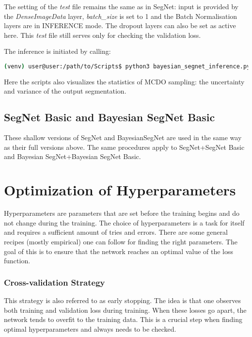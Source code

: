 \newpage
The setting of the \textit{test} file remains the same as in SegNet: input is provided by the \textit{DenseImageData} layer, \textit{batch\_size} is set to 1 and the Batch Normalisation layers are in INFERENCE mode. The dropout layers can also be set as active here. This \textit{test} file still serves only for checking the validation loss.

The inference is initiated by calling:

\begin{lstlisting}[language=bash]
(venv) user@user:/path/to/Scripts$ python3 bayesian_segnet_inference.py /path/to/inference.prototxt /path/to/final_weights.caffemodel /path/to/videofile.avi 
\end{lstlisting}

Here the scripts also visualizes the statistics of MCDO sampling: the uncertainty and variance of the output segmentation.

\subsection{SegNet Basic and Bayesian SegNet Basic}

These shallow versions of SegNet and BayesianSegNet are used in the same way as their full versions above. The same procedures apply to SegNet+SegNet Basic and Bayesian SegNet+Bayesian SegNet Basic.

\newpage
\section{Optimization of Hyperparameters}

Hyperparameters are parameters that are set before the training begins and do not change during the training. The choice of hyperparameters is a task for itself and requires a sufficient amount of tries and errors. There are some general recipes (mostly empirical) one can follow for finding the right parameters. The goal of this is to ensure that the network reaches an optimal value of the loss function. \cite{stanford-github}

\subsubsection{Cross-validation Strategy}

This strategy is also referred to as early stopping. The idea is that one observes both training and validation loss during training. When these losses go apart, the network tends to overfit to the training data. This is a crucial step when finding optimal hyperparameters and always needs to be checked. \cite{stanford-github}

